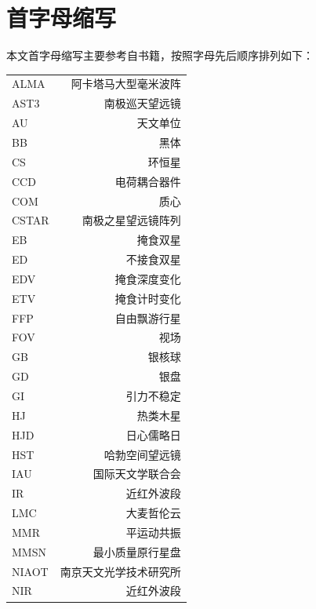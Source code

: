 \section{首字母缩写}  \label{apdx:acronym}
本文首字母缩写主要参考自书籍，按照字母先后顺序排列如下：
\begin{multicols}{2}
\begin{tabularx}{0.85\linewidth}{@{\extracolsep{\fill}}lr}
\centering
ALMA           &   阿卡塔马大型毫米波阵     	  \\ 
AST3           &   南极巡天望远镜     	   	  \\  
AU		   &	天文单位				  \\
BB		   &   黑体					   \\
CS 	 	   &   环恒星				   \\
CCD		   &   电荷耦合器件			   \\
COM		   &   质心					   \\
CSTAR        &   南极之星望远镜阵列 		   \\  
EB               &   掩食双星 				   \\ 
ED               &   不接食双星 		 	   \\ 
EDV             &   掩食深度变化             	   \\
ETV             &   掩食计时变化             	   \\
FFP             &   自由飘游行星        		   \\ 
FOV            &   视场			     		   \\ 
GB              &   银核球				   \\
GD              &   银盘				  	    \\
GI                &   引力不稳定              		    \\
HJ               &    热类木星              		    \\
HJD            &    日心儒略日 	           	    \\
HST            &    哈勃空间望远镜            	    \\
IAU             &    国际天文学联合会   	    	    \\
IR               &   近红外波段		 	            \\
LMC            &   大麦哲伦云		 	    \\
MMR           &   平运动共振   	                     \\   
MMSN         &   最小质量原行星盘                 \\
NIAOT         &   南京天文光学技术研究所       \\
NIR              &   近红外波段		             \\


\end{tabularx}
\end{multicols}
